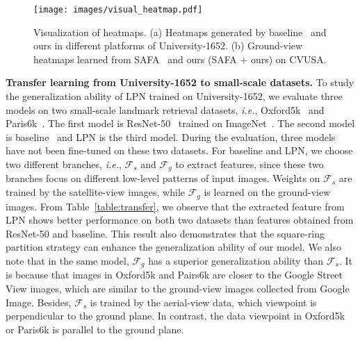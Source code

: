 \documentclass[journal]{IEEEtran}
\def\ie{\emph{i.e.}}
\begin{document}
\begin{figure}[htp]
  \centering
  \texttt{[image: images/visual\_heatmap.pdf]}
  \caption{
  Visualization of heatmaps. (a) Heatmaps generated by baseline~\cite{zheng_university-1652_nodate} and ours in different platforms of University-1652. (b) Ground-view heatmaps learned from SAFA~\cite{shi_spatial-aware_nodate} and ours (SAFA + ours) on CVUSA. 
  }
  \label{fig:visual_heatmap}
\end{figure}
\textbf{Transfer learning from University-1652 to small-scale datasets.} 
To study the generalization ability of LPN trained on University-1652, we evaluate three models on two small-scale landmark retrieval datasets, \ie, Oxford5k~\cite{philbin2007object} and Paris6k~\cite{philbin2008lost}. The first model is ResNet-50~\cite{he2016deep} trained on ImageNet~\cite{5206848}. The second model is baseline~\cite{zheng_university-1652_nodate} and LPN is the third model. During the evaluation, three models have not been fine-tuned on these two datasets. For baseline and LPN, we choose two different branches, \ie, $\mathcal{F}_s$ and $\mathcal{F}_g$ to extract features, since these two branches focus on different low-level patterns of input images. Weights on $\mathcal{F}_s$ are trained by the satellite-view images, while $\mathcal{F}_g$ is learned on the ground-view images. From Table~\ref{table:transfer}, we observe that the extracted feature from LPN shows better performance on both two datasets than features obtained from ResNet-50 and baseline. This result also demonstrates that the square-ring partition strategy can enhance the generalization ability of our model.
We also note that in the same model, $\mathcal{F}_g$ has a superior generalization ability than $\mathcal{F}_s$. It is because that images in Oxford5k and Pairs6k are closer to the Google Street View images, which are similar to the ground-view images collected from Google Image. Besides, $\mathcal{F}_s$ is trained by the aerial-view data, which viewpoint is perpendicular to the ground plane. In contrast, the data viewpoint in Oxford5k or Paris6k is parallel to the ground plane.
\end{document}
